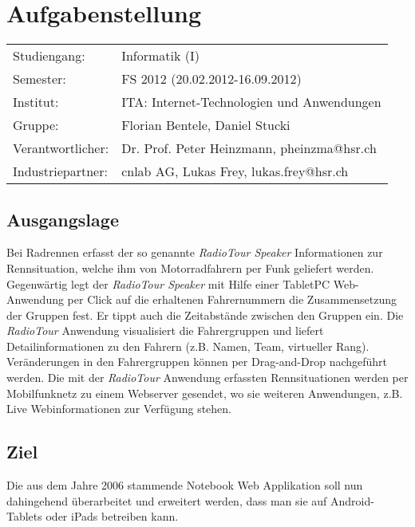 \chapter*{Aufgabenstellung}

\begin{tabular}{ll}
Studiengang: & Informatik (I)\\
Semester: & FS 2012 (20.02.2012-16.09.2012)\\
Institut: & ITA: Internet-Technologien und Anwendungen\\
Gruppe: & Florian Bentele, Daniel Stucki\\
Verantwortlicher: & Dr. Prof. Peter Heinzmann, pheinzma@hsr.ch\\
Industriepartner: & cnlab AG, Lukas Frey, lukas.frey@hsr.ch

\end{tabular}

\section*{Ausgangslage}
Bei Radrennen erfasst der so genannte \textit{RadioTour Speaker} Informationen zur Rennsituation, welche ihm von Motorradfahrern per Funk geliefert werden. Gegenwärtig legt der \textit{RadioTour Speaker} mit Hilfe einer TabletPC Web-Anwendung per Click auf die erhaltenen Fahrernummern die Zusammensetzung der Gruppen fest. Er tippt auch die Zeitabstände zwischen den Gruppen ein. Die \textit{RadioTour} Anwendung  visualisiert die Fahrergruppen und liefert Detailinformationen zu den Fahrern (z.B. Namen, Team, virtueller Rang). Veränderungen in den Fahrergruppen können per Drag-and-Drop nachgeführt werden. Die mit der \textit{RadioTour} Anwendung erfassten Rennsituationen werden per Mobilfunknetz zu einem Webserver gesendet, wo sie weiteren Anwendungen, z.B. Live Webinformationen zur Verfügung stehen.

\section*{Ziel}
Die aus dem Jahre 2006 stammende Notebook Web Applikation soll nun dahingehend überarbeitet und erweitert werden, dass man sie auf Android-Tablets oder iPads betreiben kann.

